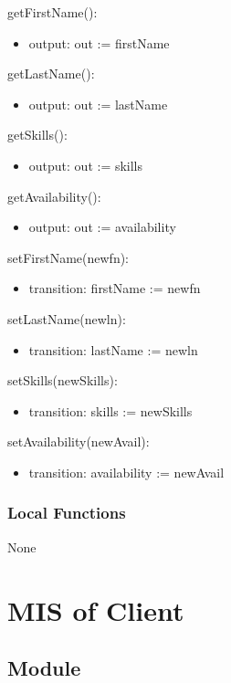 \documentclass[12pt, titlepage]{article}
\begin{document}
\noindent getFirstName():
\begin{itemize}
\item output: out := firstName
\end{itemize}

\noindent getLastName():
\begin{itemize}
\item output: out := lastName
\end{itemize}

\noindent getSkills():
\begin{itemize}
\item output: out := skills
\end{itemize}

\noindent getAvailability():
\begin{itemize}
\item output: out := availability
\end{itemize}

\noindent setFirstName(newfn):
\begin{itemize}
\item transition: firstName := newfn 
\end{itemize}

\noindent setLastName(newln):
\begin{itemize}
\item transition: lastName := newln
\end{itemize}

\noindent setSkills(newSkills):
\begin{itemize}
\item transition: skills := newSkills 
\end{itemize}

\noindent setAvailability(newAvail):
\begin{itemize}
\item transition: availability := newAvail
\end{itemize}

\subsubsection{Local Functions}
None

\section{MIS of Client} \label{client}

\subsection{Module}
\end{document}
